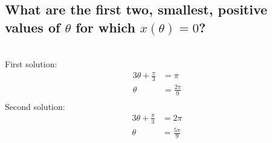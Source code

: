 \documentclass[answers]{exam}
\begin{document}
\begin{questions}
\begin{parts}
	\part{What are the first two, smallest, positive values of $\theta$ for which $x(\theta) = 0$?}
	\begin{solution}
		\\First solution:
		\begin{align*}
			3\theta + \frac{\pi}{3} &= \pi \\
			\theta &= \frac{2\pi}{9} \\
		\end{align*}
		Second solution:
		\begin{align*}
			3\theta + \frac{\pi}{3} &= 2\pi \\
			\theta &= \frac{5\pi}{9} \\
		\end{align*}
	\end{solution}
\end{parts}
\end{questions}
\end{document}

